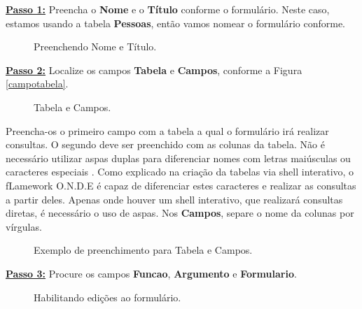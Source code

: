 \documentclass[9pt]{report}
\begin{document}
{     \underline{\textbf{Passo 1:}} Preencha o \textbf{Nome} e o
     \textbf{Título} conforme o formulário. Neste caso, estamos
     usando a tabela \textbf{Pessoas}, então vamos nomear o
     formulário conforme.
     
      \begin{figure}[H]
       \caption{Preenchendo Nome e Título.}
       \label{fig:nometitulo}
      \end{figure}
      
      \underline{\textbf{Passo 2:}} Localize os campos
      \textbf{Tabela} e \textbf{Campos}, conforme a Figura
      \ref{campotabela}.
      
      \begin{figure}[H]
       \caption{Tabela e Campos.}
       \label{fig:campotabela}
      \end{figure}
      
      Preencha-os o primeiro campo com a tabela a qual o formulário
      irá realizar consultas. O segundo deve ser preenchido com as
      colunas da tabela. Não é necessário utilizar aspas duplas para
      diferenciar nomes com letras maiúsculas ou caracteres especiais
      .
      Como explicado na criação da tabelas via shell interativo, o
      fLamework O.N.D.E é capaz de diferenciar estes caracteres e
      realizar as consultas a partir deles. Apenas onde houver um
      shell interativo, que realizará consultas diretas, é necessário
      o uso de aspas. Nos \textbf{Campos}, separe o nome da colunas
      por vírgulas.

      \begin{figure}[H]
        \caption{Exemplo de preenchimento para Tabela e Campos.}
        \label{fig:campotabela2}
      \end{figure}

      \underline{\textbf{Passo 3:}} Procure os campos
      \textbf{Funcao}, \textbf{Argumento} e \textbf{Formulario}.

      \begin{figure}[H]
        \label{fig:configform}
        \caption{Habilitando edições ao formulário.}
      \end{figure}

}
\end{document}
